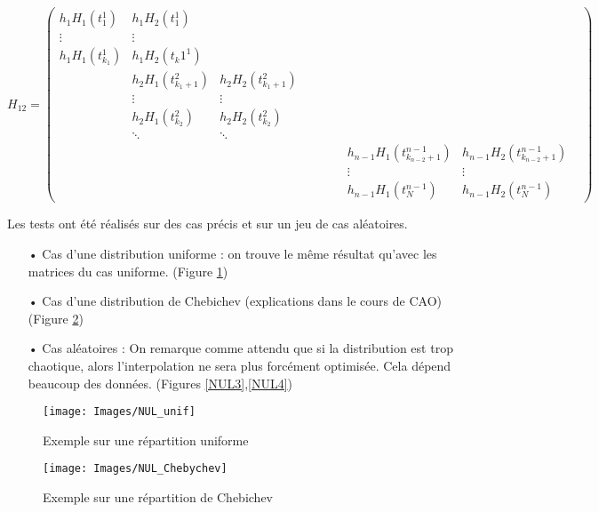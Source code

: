 \documentclass[a4paper,12pt]{article} %
\begin{document}
                
                $$H_{12}=\begin{pmatrix} h_1H_1(t_1^1)&h_1H_2(t_1^1)& & & & & & & &  \\ \vdots&\vdots& & & & & & &  \\ h_1H_1(t_{k_1}^1)&h_1H_2(t_k1^1)& & & & & & & \\ &h_2H_1(t_{{k_1}+1}^2)&h_2H_2(t_{{k_1}+1}^2)& & & & & &   \\ &\vdots&\vdots& & & & & &  \\ &h_2H_1(t_{k_2}^2)&h_2H_2(t_{k_2}^2)& & & & & & \\ &\ddots&\ddots & & & & & & & \\ & & & & & & &h_{n-1}H_1(t_{{k_{n-2}}+1}^{n-1}) &h_{n-1}H_2(t_{{k_{n-2}}+1}^{n-1})\\ & & & & & & &\vdots &\vdots\\ & & & & & & &h_{n-1}H_1(t_N^{n-1}) &h_{n-1}H_2(t_N^{n-1}) \end{pmatrix}$$
                


    			Les tests ont été réalisés sur des cas précis et sur un jeu de cas aléatoires.
    
                \begin{itemize}
                \item[•] Cas d'une distribution uniforme : on trouve le même résultat qu'avec les matrices du cas uniforme. (Figure \ref{NUL1})
                \item[•] Cas d'une distribution de Chebichev (explications dans le cours de CAO) (Figure \ref{NUL2})
                \item[•] Cas aléatoires : On remarque comme attendu que si la distribution est trop chaotique, alors l'interpolation ne sera plus forcément optimisée. Cela dépend beaucoup des données. (Figures \ref{NUL3},\ref{NUL4})
                \end{itemize}
                
                \begin{figure}[H]
                \begin{center}
                \texttt{[image: Images/NUL\_unif]} 
                \end{center}
                \caption{Exemple sur une répartition uniforme}
                \label{NUL1}
                \end{figure}
                
                \begin{figure}[H]
                \begin{center}
                \texttt{[image: Images/NUL\_Chebychev]} 
                \end{center}
                \caption{Exemple sur une répartition de Chebichev}
                \label{NUL2}
                \end{figure}
                
\end{document}
